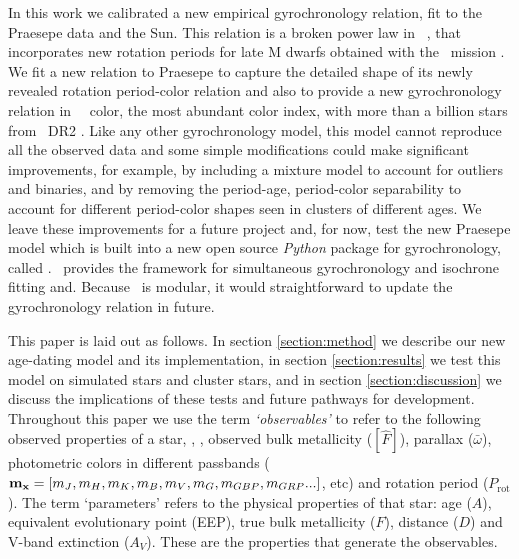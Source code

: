 In this work we calibrated a new empirical gyrochronology relation, fit to the
Praesepe data and the Sun.
This relation is a broken power law in \gaia\ \gcolor, that incorporates new
rotation periods for late M dwarfs obtained with the \ktwo\ mission
\citep{douglas2017, rebull2017}.
We fit a new relation to Praesepe to capture the detailed shape of its newly
revealed rotation period-color relation and also to provide a new
gyrochronology relation in \gaia\ \gcolor\ color, the most abundant color
index, with more than a billion stars from \gaia\ DR2 \citep{brown2018}.
Like any other gyrochronology model, this model cannot reproduce all the
observed data and some simple modifications could make significant
improvements, for example, by including a mixture model to account for
outliers and binaries, and by removing the period-age, period-color
separability to account for different period-color shapes seen in clusters of
different ages.
We leave these improvements for a future project and, for now, test the
new Praesepe model which is built into a new open source {\it Python} package
for gyrochronology, called \sd.
\sd\ provides the framework for simultaneous gyrochronology and isochrone
fitting and.
Because \sd\ is modular, it would straightforward to update the gyrochronology
relation in future.

This paper is laid out as follows.
In section \ref{section:method} we describe our new age-dating model and its
implementation, in section \ref{section:results} we test this model on
simulated stars and cluster stars, and in section \ref{section:discussion} we
discuss the implications of these tests and future pathways for development.
Throughout this paper we use the term {\it `observables'} to refer to the
following observed properties of a star, \teff, \logg, observed bulk
metallicity ($[\hat{F}]$), parallax ($\bar{\omega}$), photometric
colors in different passbands (${\bf m_x} = [m_J, m_H, m_K, m_B, m_V, m_G,
m_{GBP}, m_{GRP}...]$, etc) and rotation period ($P_{\mathrm{rot}}$).
The term `parameters' refers to the physical properties of that star: age
($A$), equivalent evolutionary point (EEP), true bulk metallicity ($F$),
distance ($D$) and V-band extinction ($A_V$).
These are the properties that generate the observables.
